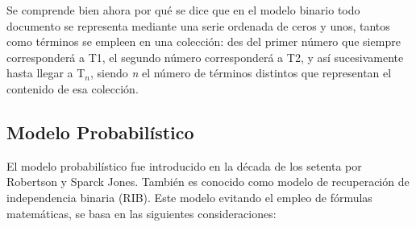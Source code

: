 \documentclass{article}
\begin{document}
Se comprende bien ahora por qué se dice que en el modelo binario todo documento se representa mediante una serie ordenada de ceros y unos, tantos como términos se empleen en una colección: des del primer número que siempre corresponderá a T1, el segundo número corresponderá a T2, y así sucesivamente hasta llegar a T$_{n}$, siendo \textit{n} el número de términos distintos que representan el contenido de esa colección.

\subsection{Modelo Probabilístico}

El modelo probabilístico fue introducido en la década de los setenta por Robertson y Sparck Jones. También es conocido como modelo de recuperación de independencia binaria (RIB). Este modelo evitando el empleo de fórmulas matemáticas, se basa en las siguientes consideraciones:
\end{document}
